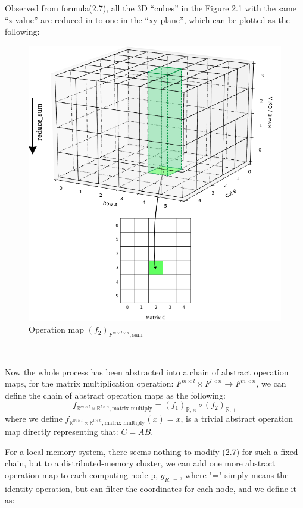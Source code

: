 \documentclass{amsart}
\theoremstyle{definition}
\theoremstyle{remark}
\numberwithin{equation}{section}
\begin{document}
	Observed from formula(2.7), all the 3D “cubes” in the Figure 2.1 with the same “z-value” are reduced in to one in the “xy-plane”, which can be plotted as the following:\par
\begin{figure}[h]
	\includegraphics[scale=0.45]{Figures/Matrix3d_Reduce.png}
	\caption{Operation map $(f_2)_{F^{m\times l\times n},\text{sum}}$}
\end{figure}
~\\
\par
Now the whole process has been abstracted into a chain of abstract operation maps, for the matrix multiplication operation: $F^{m\times l}\times F^{l\times n}\to F^{m\times n}$, we can define the chain of abstract operation maps as the following:
\begin{equation}
f_{\mathbb{R}^{m\times l}\times\mathbb{R}^{l\times n},\text{matrix multiply}} = (f_1)_{\mathbb{R},\times}\circ(f_2)_{\mathbb{R},+}
\end{equation}
	where we define $f_{\mathbb{R}^{m\times l}\times\mathbb{R}^{l\times n},\text{matrix multiply}}(x)=x$, is a trivial abstract operation map directly representing that: $C=AB$.\par
	For a local-memory system, there seems nothing to modify (2.7) for such a fixed chain, but to a distributed-memory cluster, we can add one more abstract operation map to each computing node p, $g_{R,=}$, where "=" simply means the identity operation, but can filter the coordinates for each node, and we define it as:
\end{document}
